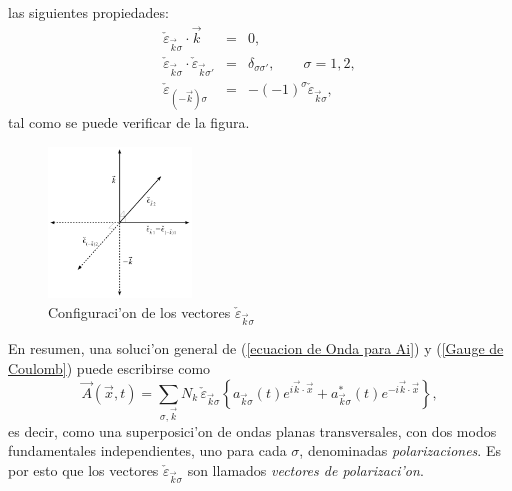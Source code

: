 las siguientes propiedades:
\begin{eqnarray}
\check{\varepsilon}_{\vec{k}\sigma}\cdot\vec{k} & = &0,\\
\check{\varepsilon}_{\vec{k}\sigma}\cdot\check{\varepsilon}_{\vec{k}\sigma'} & =
&\delta_{\sigma\sigma'},\qquad\sigma=1,2,\\
\check{\varepsilon}_{(-\vec{k})\sigma} & = &-\left( -1\right)
^{\sigma}\check{\varepsilon}_{\vec{k}\sigma},
\end{eqnarray}
tal como se puede verificar de la figura.  
\begin{figure}[ht]
\begin{center}
\includegraphics[height=4cm]{figs/fig-vec01.pdf}
\caption{Configuraci'on de los vectores $\check{\varepsilon}_{\vec{k}\sigma}$}
\label{figkep}
\end{center}
\end{figure}
En resumen, una soluci'on general de (\ref{ecuacion de Onda para Ai}) y
(\ref{Gauge de Coulomb}) puede escribirse como
\begin{equation}
\vec{A}(\vec{x},t)  =
\sum_{\sigma,\vec{k}}N_k\,\check{\varepsilon}_{\vec{k}\sigma}\left\{
a_{\vec{k}\sigma}(t)e^{i\vec{k}\cdot\vec{x}}+a_{\vec{k}\sigma}^*(t)e^{-i\vec{k}
\cdot\vec{x}}\right\} ,
\end{equation} 
es decir, como una superposici'on de ondas planas transversales, con dos modos
fundamentales independientes, uno para cada $\sigma$, denominadas
\textit{polarizaciones}. Es por esto que los vectores
$\check{\varepsilon}_{\vec{k}\sigma}$ son llamados \textit{vectores de
polarizaci'on}.

